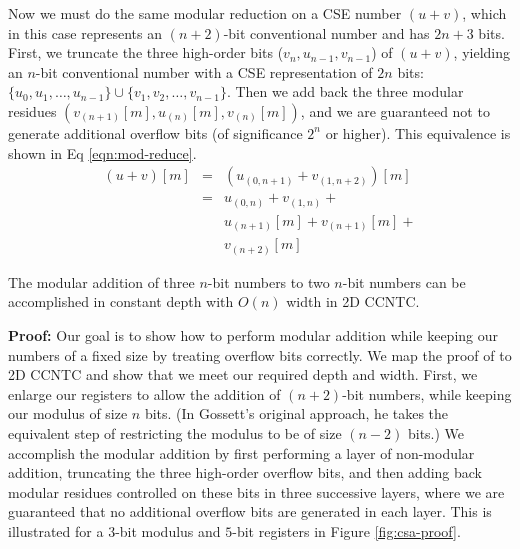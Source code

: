 Now we must do the same modular reduction on a CSE number $(u+v)$,
which in this case represents an $(n+2)$-bit conventional number and has
$2n+3$ bits.
%
%
First, we truncate the three high-order bits ($v_{n}, u_{n-1}, v_{n-1}$)
of $(u+v)$, yielding an $n$-bit
conventional number with a CSE representation of $2n$ bits:
$\{u_0, u_1, \ldots, u_{n-1}\} \cup \{v_1, v_2, \ldots, v_{n-1}\}$.
Then we add back the three modular residues
$(v_{(n+1)}[m], u_{(n)}[m], v_{(n)}[m])$, and we are guaranteed not to
generate additional overflow bits (of significance $2^{n}$ or higher). This equivalence
is shown in Eq \ref{eqn:mod-reduce}.
\begin{eqnarray}
(u+v)[m] &=& \left(u_{(0,n+1)} + v_{(1,n+2)}\right)[m] \nonumber \\
 &=& u_{(0,n)} +
     v_{(1,n)} + \nonumber \\
 & & u_{(n+1)}[m] +
     v_{(n+1)}[m] + \nonumber \\
 & & v_{(n+2)}[m]
\label{eqn:mod-reduce}
\end{eqnarray}

\begin{lemma}
The modular addition of three $n$-bit numbers to two $n$-bit numbers can be
accomplished
in constant depth with $O(n)$ width in \textsc{2D CCNTC}.
\end{lemma}

\vspace*{12pt}
\noindent
{\bf Proof:}
Our goal is to show how to perform modular addition while keeping our numbers
of a fixed size by treating overflow bits correctly.
We map the proof of \cite{Gossett1998} to \textsc{2D CCNTC} and show that
we meet our required depth and width.
First, we enlarge our registers to allow the addition of $(n+2)$-bit numbers,
while keeping our modulus of size $n$ bits.
(In Gossett's original approach, he takes the equivalent step of restricting
the modulus to be of size $(n-2)$ bits.) We accomplish the modular addition
by first performing a layer of non-modular addition, truncating the three high-order
overflow bits, and then adding back modular residues controlled on these
bits in three successive layers, where we are guaranteed that no additional
overflow bits are generated in each layer.
This is illustrated for a $3$-bit modulus and $5$-bit registers
in Figure \ref{fig:csa-proof}.

